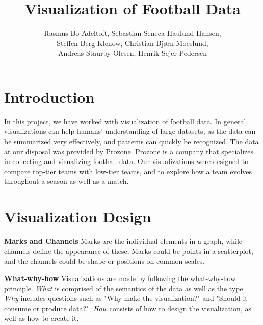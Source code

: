 \documentclass[portrait, a0,30pt]{sciposter}
\title{\fontsize{115}{5}\selectfont Visualization of Football Data}
\author{Rasmus Bo Adeltoft, 
Sebastian Seneca Haulund Hansen, \\
Steffen Berg Klenow, 
Christian Bjørn Moeslund, \\
Andreas Staurby Olesen, 
Henrik Sejer Pedersen}
\institute{Department of Mathematics and Computer Science, University of Southern Denmark}
\begin{document}

\begin{mdframed}[backgroundcolor=white,innertopmargin=2cm]

\maketitle
\end{mdframed}
\begin{multicols}{2}





\section*{Introduction}
\begin{mdframed}
In this project, we have worked with visualization of football data. In general, visualizations can help humans’ understanding of large datasets, as the data can be summarized very effectively, and patterns can quickly be recognized.
The data at our disposal was provided by Prozone. Prozone is a company that specializes in collecting and visualizing football data.
Our visualizations were designed to compare top-tier teams with low-tier teams, and to explore how a team evolves throughout a season as well as a match.
\end{mdframed}
\section*{Visualization Design}
\begin{mdframed}
	\textbf{Marks and Channels}
	Marks are the individual elements in a graph, while channels define the appearance of these. Marks could be points in a scatterplot, and the channels could be shape or positions on common scales. 
	
	\textbf{What-why-how}
	Visualizations are made by following the what-why-how principle. \emph{What} is comprised of the semantics of the data as well as the type. \emph{Why} includes questions such as "Why make the visualization?" and "Should it consume or produce data?". \emph{How} consists of how to design the visualization, as well as how to create it.
\end{mdframed}



\end{multicols}
\end{document}
